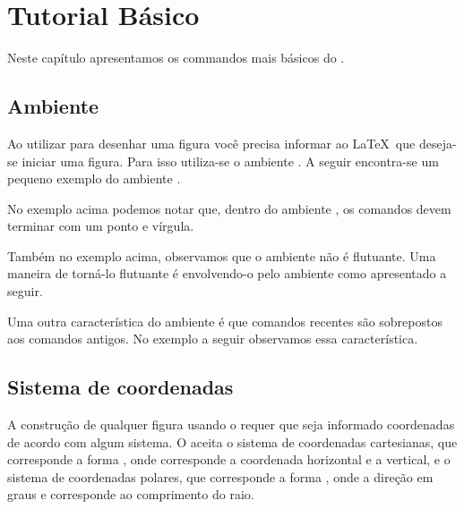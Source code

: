 % 
% 
% 
% 
% 
\chapter{Tutorial B\'{a}sico}
Neste cap\'{i}tulo apresentamos os commandos mais b\'{a}sicos do \TikZ.

\section{Ambiente }
Ao utilizar \TikZ para desenhar uma figura voc\^{e} precisa informar ao \LaTeX \ que deseja-se iniciar uma figura. Para isso utiliza-se o ambiente . A seguir encontra-se um pequeno exemplo do ambiente . 


No exemplo acima podemos notar que, dentro do ambiente , os comandos devem terminar com um ponto e v\'{i}rgula.

Tamb\'{e}m no exemplo acima, observamos que o ambiente  n\~{a}o \'{e} flutuante. Uma maneira de torn\'{a}-lo flutuante \'{e} envolvendo-o pelo ambiente  como apresentado a seguir.


Uma outra caracter\'{i}stica do ambiente  \'{e} que comandos recentes s\~{a}o sobrepostos aos comandos antigos. No exemplo a seguir observamos essa caracter\'{i}stica.


\section{Sistema de coordenadas}
A constru\c{c}\~{a}o de qualquer figura usando o \TikZ requer que seja informado coordenadas de acordo com algum sistema. O \TikZ aceita o sistema de coordenadas cartesianas, que corresponde a forma , onde  corresponde a coordenada horizontal e  a vertical, e o sistema de coordenadas polares, que corresponde a forma , onde  a dire\c{c}\~{a}o em graus e  corresponde ao comprimento do raio.

